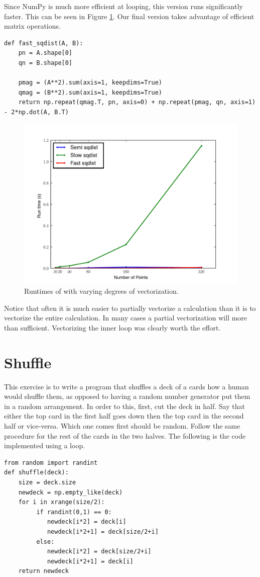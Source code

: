 Since NumPy is much more efficient at looping, this version runs significantly faster.  This can be seen in Figure \ref{fig:sqplot}.
Our final version takes advantage of efficient matrix operations.
\begin{lstlisting}
def fast_sqdist(A, B):
    pn = A.shape[0]
    qn = B.shape[0]
    
    pmag = (A**2).sum(axis=1, keepdims=True)
    qmag = (B**2).sum(axis=1, keepdims=True)
    return np.repeat(qmag.T, pn, axis=0) + np.repeat(pmag, qn, axis=1) - 2*np.dot(A, B.T)
\end{lstlisting}

\begin{figure}[h]
\centering
\includegraphics[width=\textwidth]{sqplot.pdf}
\caption{Runtimes of  with varying degrees of vectorization.}
\label{fig:sqplot}
\end{figure}

Notice that often it is much easier to partially vectorize a calculation than it is to vectorize the entire calculation.
In many cases a partial vectorization will more than sufficient.  Vectorizing the inner loop was clearly worth the effort.

\section*{Shuffle}
This exercise is to write a program that shuffles a deck of a cards how a human would shuffle them, as opposed to having a random number generator put them in a random arrangement. 
In order to this, first, cut the deck in half. 
Say that either the top card in the first half goes down then the top card in the second half or vice-versa.
Which one comes first should be random.
Follow the same procedure for the rest of the cards in the two halves. 
The following is the code implemented using a loop.
\begin{lstlisting}
from random import randint
def shuffle(deck):
    size = deck.size
    newdeck = np.empty_like(deck)
    for i in xrange(size/2):
         if randint(0,1) == 0:
            newdeck[i*2] = deck[i]
            newdeck[i*2+1] = deck[size/2+i]
         else:
            newdeck[i*2] = deck[size/2+i]
            newdeck[i*2+1] = deck[i]
    return newdeck
\end{lstlisting}

